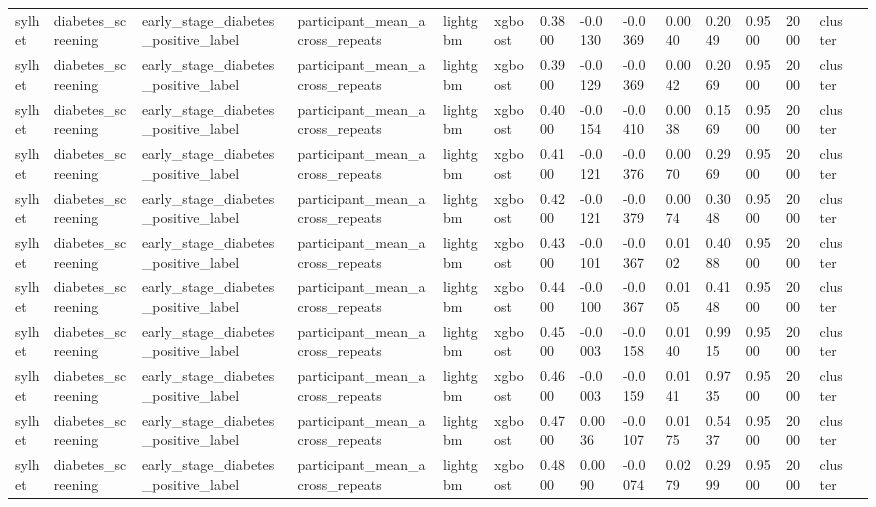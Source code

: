 \begin{tabular}{lllllllllllllll}
sylhet & diabetes\_screening & early\_stage\_diabetes\_positive\_label & participant\_mean\_across\_repeats & lightgbm & xgboost & 0.3800 & -0.0130 & -0.0369 & 0.0040 & 0.2049 & 0.9500 & 2000 & cluster &  \\
sylhet & diabetes\_screening & early\_stage\_diabetes\_positive\_label & participant\_mean\_across\_repeats & lightgbm & xgboost & 0.3900 & -0.0129 & -0.0369 & 0.0042 & 0.2069 & 0.9500 & 2000 & cluster &  \\
sylhet & diabetes\_screening & early\_stage\_diabetes\_positive\_label & participant\_mean\_across\_repeats & lightgbm & xgboost & 0.4000 & -0.0154 & -0.0410 & 0.0038 & 0.1569 & 0.9500 & 2000 & cluster &  \\
sylhet & diabetes\_screening & early\_stage\_diabetes\_positive\_label & participant\_mean\_across\_repeats & lightgbm & xgboost & 0.4100 & -0.0121 & -0.0376 & 0.0070 & 0.2969 & 0.9500 & 2000 & cluster &  \\
sylhet & diabetes\_screening & early\_stage\_diabetes\_positive\_label & participant\_mean\_across\_repeats & lightgbm & xgboost & 0.4200 & -0.0121 & -0.0379 & 0.0074 & 0.3048 & 0.9500 & 2000 & cluster &  \\
sylhet & diabetes\_screening & early\_stage\_diabetes\_positive\_label & participant\_mean\_across\_repeats & lightgbm & xgboost & 0.4300 & -0.0101 & -0.0367 & 0.0102 & 0.4088 & 0.9500 & 2000 & cluster &  \\
sylhet & diabetes\_screening & early\_stage\_diabetes\_positive\_label & participant\_mean\_across\_repeats & lightgbm & xgboost & 0.4400 & -0.0100 & -0.0367 & 0.0105 & 0.4148 & 0.9500 & 2000 & cluster &  \\
sylhet & diabetes\_screening & early\_stage\_diabetes\_positive\_label & participant\_mean\_across\_repeats & lightgbm & xgboost & 0.4500 & -0.0003 & -0.0158 & 0.0140 & 0.9915 & 0.9500 & 2000 & cluster &  \\
sylhet & diabetes\_screening & early\_stage\_diabetes\_positive\_label & participant\_mean\_across\_repeats & lightgbm & xgboost & 0.4600 & -0.0003 & -0.0159 & 0.0141 & 0.9735 & 0.9500 & 2000 & cluster &  \\
sylhet & diabetes\_screening & early\_stage\_diabetes\_positive\_label & participant\_mean\_across\_repeats & lightgbm & xgboost & 0.4700 & 0.0036 & -0.0107 & 0.0175 & 0.5437 & 0.9500 & 2000 & cluster &  \\
sylhet & diabetes\_screening & early\_stage\_diabetes\_positive\_label & participant\_mean\_across\_repeats & lightgbm & xgboost & 0.4800 & 0.0090 & -0.0074 & 0.0279 & 0.2999 & 0.9500 & 2000 & cluster &  \\

\end{tabular}

